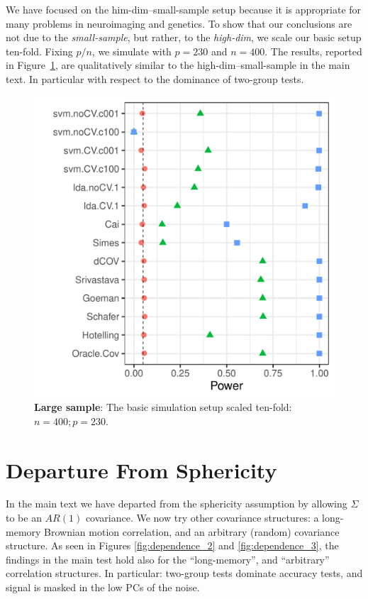 \documentclass[]{bio}
\begin{document}
We have focused on the him-dim--small-sample setup because it is appropriate for many problems in neuroimaging and genetics. 
To show that our conclusions are not due to the \emph{small-sample}, but rather, to the \emph{high-dim}, we scale our basic setup ten-fold. 
Fixing $p/n$, we simulate with $p=230$ and $n=400$. 
The results, reported in Figure~\ref{fig:large-sample}, are qualitatively similar to the high-dim--small-sample in the main text. 
In particular with respect to the dominance of two-group tests. 
\begin{figure}[h]
	\centering
	\includegraphics[width=0.45\columnwidth]{"art/file1"}
	\caption{\textbf{Large sample}: The basic simulation setup scaled ten-fold: $n=400; p=230$.}
	\label{fig:large-sample}
\end{figure}





\section{Departure From Sphericity}
In the main text we have departed from the sphericity assumption by allowing $\Sigma$ to be an $AR(1)$ covariance. 
We now try other covariance structures: a long-memory Brownian motion correlation, and an arbitrary (random) covariance structure. 
As seen in Figures \ref{fig:dependence_2} and \ref{fig:dependence_3}, the findings in the main test hold also for the ``long-memory'', and ``arbitrary'' correlation structures.
In particular: two-group tests dominate accuracy tests, and signal is masked in the low PCs of the noise. 
\end{document}
